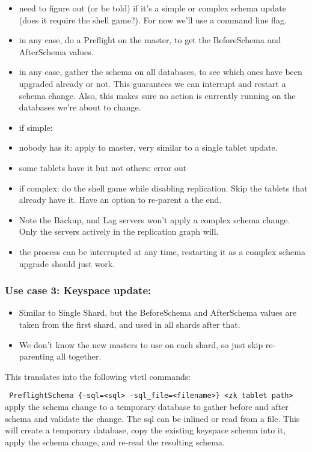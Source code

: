 \begin{itemize}
\item need to figure out (or be told) if it’s a simple or complex schema update (does it require the shell game?). For now we'll use a command line flag.
\item in any case, do a Preflight on the master, to get the BeforeSchema and AfterSchema values.
\item in any case, gather the schema on all databases, to see which ones have been upgraded already or not. This guarantees we can interrupt and restart a schema change. Also, this makes sure no action is currently running on the databases we're about to change.
\item if simple:
\item nobody has it: apply to master, very similar to a single tablet update.
\item some tablets have it but not others: error out
\item if complex: do the shell game while disabling replication. Skip the tablets that already have it. Have an option to re-parent a the end.
\item Note the Backup, and Lag servers won't apply a complex schema change. Only the servers actively in the replication graph will.
\item the process can be interrupted at any time, restarting it as a complex schema upgrade should just work.
\end{itemize}

\subsubsection{Use case 3: Keyspace update:}\hypertarget{use-case-3-keyspace-update}{}\label{use-case-3-keyspace-update}

\begin{itemize}
\item Similar to Single Shard, but the BeforeSchema and AfterSchema values are taken from the first shard, and used in all shards after that.
\item We don't know the new masters to use on each shard, so just skip re-parenting all together.
\end{itemize}

This translates into the following vtctl commands:

{\tt 
PreflightSchema \{-sql=\textless{}sql\textgreater{} \textbar{}\textbar{} -sql\_file=\textless{}filename\textgreater{}\} \textless{}zk tablet path\textgreater{} 
}
apply the schema change to a temporary database to gather before and after schema and validate the change. The sql can be inlined or read from a file.
This will create a temporary database, copy the existing keyspace schema into it, apply the schema change, and re-read the resulting schema.

